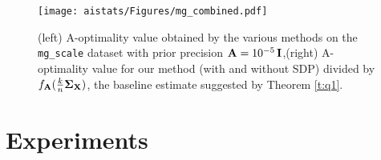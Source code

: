 \begin{figure}
    \centering
    \hspace{-0.35cm}
    \texttt{[image: aistats/Figures/mg\_combined.pdf]}
    \caption{(left) A-optimality value obtained by the various methods on
        the \texttt{mg\_scale} dataset \cite{libsvm} with
        prior precision $\mathbf A = 10^{-5}\, \mathbf I$,\quad (right)
A-optimality value for our method (with and without SDP) divided by
$f_{\mathbf A}(\frac kn\mathbf{\Sigma}_{\mathbf X})$, the baseline estimate suggested by Theorem \ref{t:q1}.}
    \label{f:experiments}
\end{figure}


\section{Experiments}\label{s:experiments}

